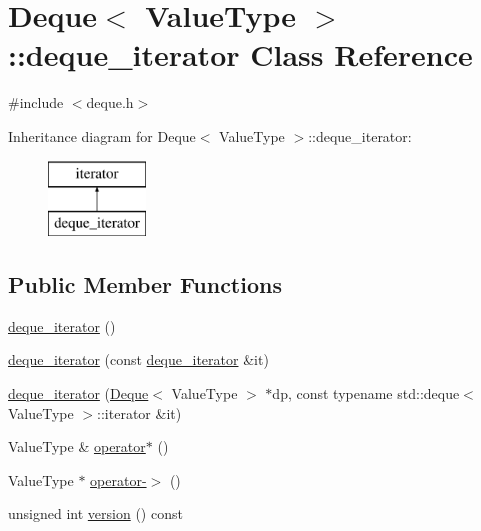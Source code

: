 \hypertarget{classDeque_1_1deque__iterator}{}\section{Deque$<$ Value\+Type $>$\+:\+:deque\+\_\+iterator Class Reference}
\label{classDeque_1_1deque__iterator}


{\ttfamily \#include $<$deque.\+h$>$}

Inheritance diagram for Deque$<$ Value\+Type $>$\+:\+:deque\+\_\+iterator\+:\begin{figure}[H]
\begin{center}
\leavevmode
\includegraphics[height=2.000000cm]{classDeque_1_1deque__iterator}
\end{center}
\end{figure}
\subsection*{Public Member Functions}
\begin{DoxyCompactItemize}
\item 
\mbox{\hyperlink{classDeque_1_1deque__iterator_a3f358d267310712916ec18dc2cccd828}{deque\+\_\+iterator}} ()
\item 
\mbox{\hyperlink{classDeque_1_1deque__iterator_a89cd596f74f9635b2569c59d20fec624}{deque\+\_\+iterator}} (const \mbox{\hyperlink{classDeque_1_1deque__iterator}{deque\+\_\+iterator}} \&it)
\item 
\mbox{\hyperlink{classDeque_1_1deque__iterator_ad01c27b2cbcd73063836767611c03a3e}{deque\+\_\+iterator}} (\mbox{\hyperlink{classDeque}{Deque}}$<$ Value\+Type $>$ $\ast$dp, const typename std\+::deque$<$ Value\+Type $>$\+::iterator \&it)
\item 
Value\+Type \& \mbox{\hyperlink{classDeque_1_1deque__iterator_ae7b3826e734ec2f7c79f5196fad83989}{operator$\ast$}} ()
\item 
Value\+Type $\ast$ \mbox{\hyperlink{classDeque_1_1deque__iterator_a5ba42337ec7bae549bb135838933b0ea}{operator-\/$>$}} ()
\item 
unsigned int \mbox{\hyperlink{classDeque_1_1deque__iterator_a0aa696ccb72cbf928535d6b646bac1aa}{version}} () const
\end{DoxyCompactItemize}


